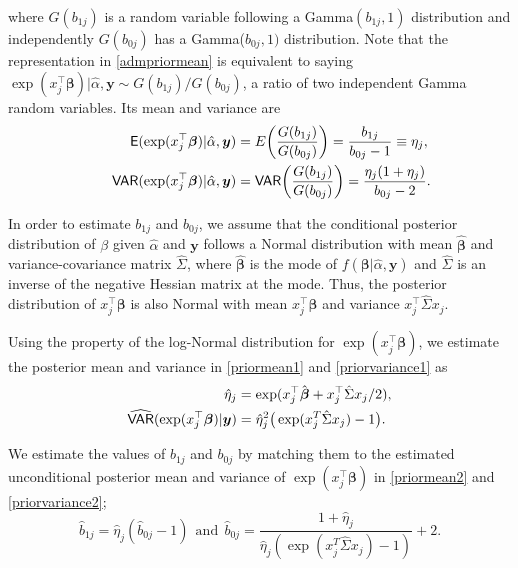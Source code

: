 \documentclass[article]{jss}
\begin{document}
where $G(b_{1j})$ is a random variable following a Gamma$(b_{1j}, 1)$ distribution and independently $G(b_{0j})$ has a Gamma($b_{0j}, 1)$ distribution.  Note that the representation in  \eqref{admpriormean} is equivalent to saying $\exp(x_j^\top\boldsymbol{\beta})\vert\hat{\alpha}, \boldsymbol{y}\sim G(b_{1j})/G(b_{0j})$, a ratio of two independent Gamma random variables. Its mean and variance are
\begin{align}
\mathsf{E}(\exp(x_j^\top\boldsymbol{\beta})\vert\hat{\alpha}, \boldsymbol{y})&=E\bigg(\frac{G(b_{1j})}{G(b_{0j})}\bigg)=\frac{b_{1j}}{b_{0j}-1}\equiv\eta_j,\label{priormean1}\\
~~~~~\mathsf{VAR}(\exp(x_j^\top\boldsymbol{\beta})\vert\hat{\alpha}, \boldsymbol{y})&=\mathsf{VAR}\bigg(\frac{G(b_{1j})}{G(b_{0j})}\bigg)=\frac{\eta_j(1+\eta_j)}{b_{0j}-2}.\label{priorvariance1}
\end{align}

In order to estimate $b_{1j}$ and $b_{0j}$, we assume that the conditional posterior distribution of $\beta$ given $\hat{\alpha}$ and $\boldsymbol{y}$ follows a Normal distribution with mean $\hat{\boldsymbol{\beta}}$ and variance-covariance matrix $\hat{\Sigma}$, where $\hat{\boldsymbol{\beta}}$ is the mode of $f(\boldsymbol{\beta}\vert \hat{\alpha}, \boldsymbol{y})$  and $\hat{\Sigma}$ is an inverse of the negative Hessian matrix at the mode. Thus, the posterior distribution of $x_j^\top\boldsymbol{\beta}$ is also Normal with mean $x_j^\top\hat{\boldsymbol{\beta}}$ and variance $x_j^\top\hat{\Sigma} x_j$.

Using the property of the log-Normal distribution for $\exp(x_j^\top\boldsymbol{\beta})$, we estimate the posterior mean and variance in  \eqref{priormean1} and \eqref{priorvariance1} as
\begin{align}
\hat{\eta}_j&=\exp(x_j^\top\hat{\boldsymbol{\beta}}+x_j^\top\hat{\Sigma} x_j/2),\label{priormean2}\\
\widehat{\mathsf{VAR}}(\exp(x_j^\top\boldsymbol{\beta})\vert\boldsymbol{y})&=\hat{\eta}^2_j\big(\exp(x_j^{T}\hat{\Sigma} x_j)-1\big).\label{priorvariance2}
\end{align}

We estimate the values of $b_{1j}$ and $b_{0j}$  by matching them to the estimated unconditional posterior mean and variance of $\exp(x_j^\top\boldsymbol{\beta})$ in  \eqref{priormean2} and \eqref{priorvariance2};
\begin{equation}\label{priormeanpara}
\hat{b}_{1j}=\hat{\eta}_j(\hat{b}_{0j}-1)~~\textrm{and}~~\hat{b}_{0j}=\frac{1+\hat{\eta}_j}{\hat{\eta}_j(\exp(x_j^{T}\hat{\Sigma} x_j)-1)}+2.
\end{equation}
\end{document}
